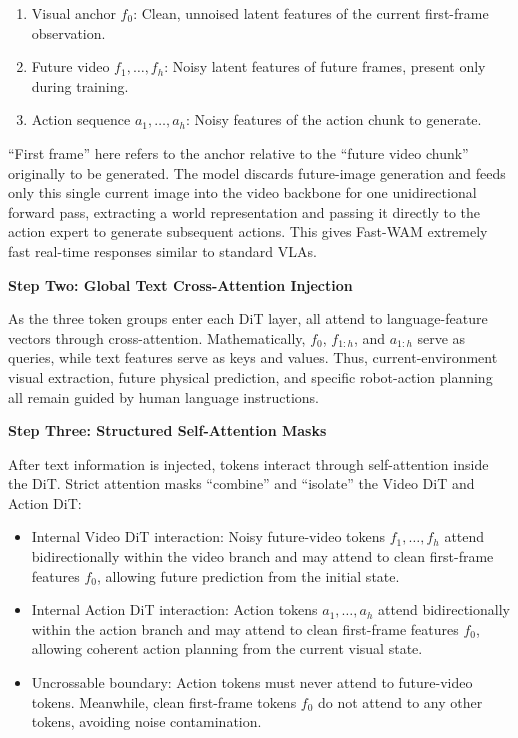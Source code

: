 \begin{enumerate}
\def\labelenumi{\arabic{enumi}.}
\tightlist
\item
  Visual anchor \(f_0\): Clean, unnoised latent features of the current first-frame observation.
\item
  Future video \(f_1,\ldots,f_h\): Noisy latent features of future frames, present only during training.
\item
  Action sequence \(a_1,\ldots,a_h\): Noisy features of the action chunk to generate.
\end{enumerate}

``First frame'' here refers to the anchor relative to the ``future video chunk'' originally to be generated. The model discards future-image generation and feeds only this single current image into the video backbone for one unidirectional forward pass, extracting a world representation and passing it directly to the action expert to generate subsequent actions. This gives Fast-WAM extremely fast real-time responses similar to standard VLAs.

\textbf{Step Two: Global Text Cross-Attention Injection}

As the three token groups enter each DiT layer, all attend to language-feature vectors through cross-attention. Mathematically, \(f_0\), \(f_{1:h}\), and \(a_{1:h}\) serve as queries, while text features serve as keys and values. Thus, current-environment visual extraction, future physical prediction, and specific robot-action planning all remain guided by human language instructions.

\textbf{Step Three: Structured Self-Attention Masks}

After text information is injected, tokens interact through self-attention inside the DiT. Strict attention masks ``combine'' and ``isolate'' the Video DiT and Action DiT:

\begin{itemize}
\tightlist
\item
  Internal Video DiT interaction: Noisy future-video tokens \(f_1,\ldots,f_h\) attend bidirectionally within the video branch and may attend to clean first-frame features \(f_0\), allowing future prediction from the initial state.
\item
  Internal Action DiT interaction: Action tokens \(a_1,\ldots,a_h\) attend bidirectionally within the action branch and may attend to clean first-frame features \(f_0\), allowing coherent action planning from the current visual state.
\item
  Uncrossable boundary: Action tokens must never attend to future-video tokens. Meanwhile, clean first-frame tokens \(f_0\) do not attend to any other tokens, avoiding noise contamination.
\end{itemize}

